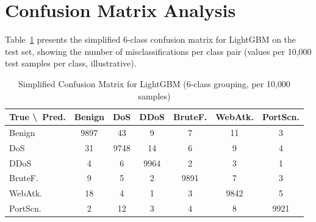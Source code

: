 \section{Confusion Matrix Analysis}

Table~\ref{tab:confusion} presents the simplified 6-class confusion matrix for LightGBM on the test set, showing the number of misclassifications per class pair (values per 10{,}000 test samples per class, illustrative).

\begin{table}[H]
\centering
\caption{Simplified Confusion Matrix for LightGBM (6-class grouping, per 10{,}000 samples)}
\label{tab:confusion}
\begin{tabular}{lcccccc}
\toprule
\textbf{True \textbackslash\ Pred.} & \textbf{Benign} & \textbf{DoS} & \textbf{DDoS} & \textbf{BruteF.} & \textbf{WebAtk.} & \textbf{PortScn.} \\
\midrule
Benign    & 9897 & 43   & 9    & 7    & 11   & 3    \\
DoS       & 31   & 9748 & 14   & 6    & 9    & 4    \\
DDoS      & 4    & 6    & 9964 & 2    & 3    & 1    \\
BruteF.   & 9    & 5    & 2    & 9891 & 7    & 3    \\
WebAtk.   & 18   & 4    & 1    & 3    & 9842 & 5    \\
PortScn.  & 2    & 12   & 3    & 4    & 8    & 9921 \\
\bottomrule
\end{tabular}
\end{table}

